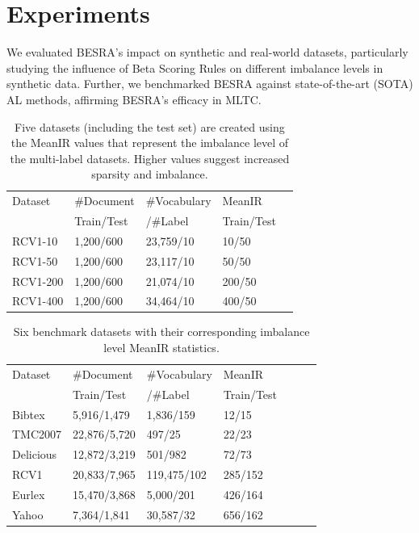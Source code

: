 \documentclass[letterpaper]{article} %
\begin{document}
\section{Experiments}
\label{sec:experiment}

We evaluated BESRA's impact on synthetic and real-world datasets, particularly studying the influence of Beta Scoring Rules on different imbalance levels in synthetic data. Further, we benchmarked BESRA against state-of-the-art (SOTA) AL methods, affirming BESRA's efficacy in MLTC.


\begin{table}[!t]
  \centering
  \begin{tabular}{lllll}
    \toprule
  Dataset     & \#Document   & \#Vocabulary  & MeanIR \\
             & Train/Test   & /\#Label  & Train/Test \\
    \midrule
    RCV1-10     & 1,200/600 & 23,759/10  & 10/50 \\
    RCV1-50      & 1,200/600 & 23,117/10  & 50/50\\
   RCV1-200      & 1,200/600 & 21,074/10  & 200/50 \\
   RCV1-400      & 1,200/600 & 34,464/10 & 400/50 \\
    \bottomrule
  \end{tabular}
    \caption{Five datasets (including the test set) are created using the MeanIR values that represent the imbalance level of the multi-label datasets. Higher values suggest increased sparsity and imbalance.}
  \label{tab:syndataset-table}
\end{table}
\begin{table}[!tb]
  \centering
  \begin{tabular}{lllllll}
    \toprule

    Dataset     & \#Document   & \#Vocabulary    & MeanIR \\
             & Train/Test   & /\#Label & Train/Test \\
    \midrule
      Bibtex     & 5,916/1,479 & 1,836/159  & 12/15 \\
    TMC2007   & 22,876/5,720 & 497/25  & 22/23 \\
      Delicious     & 12,872/3,219 & 501/982  & 72/73 \\
    RCV1     & 20,833/7,965 & 119,475/102  & 285/152 \\
    Eurlex  & 15,470/3,868 & 5,000/201  &  426/164 \\
    Yahoo   & 7,364/1,841 & 30,587/32  & 656/162 \\

    \bottomrule
  \end{tabular}
    \caption{Six benchmark datasets with their corresponding imbalance level MeanIR statistics. }
  \label{tab:dataset-table}
\end{table}
\end{document}
